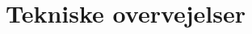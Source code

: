 \documentclass[Aflevering]{subfiles}
\begin{document}
\chapter{Tekniske overvejelser}
\end{document}
